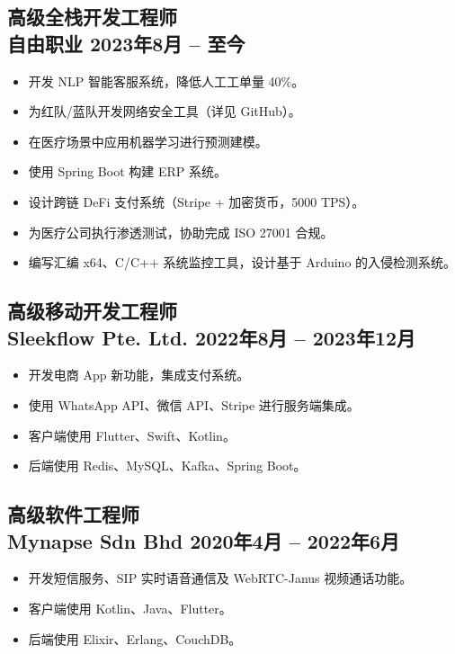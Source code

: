 \documentclass[11pt,a4paper]{article}
\begin{document}
\subsection*{高级全栈开发工程师 \\ 自由职业 \hfill 2023年8月 -- 至今}
\begin{itemize}[leftmargin=1.5em]
    \item 开发 NLP 智能客服系统，降低人工工单量 40\%。
    \item 为红队/蓝队开发网络安全工具（详见 GitHub）。
    \item 在医疗场景中应用机器学习进行预测建模。
    \item 使用 Spring Boot 构建 ERP 系统。
    \item 设计跨链 DeFi 支付系统（Stripe + 加密货币，5000 TPS）。
    \item 为医疗公司执行渗透测试，协助完成 ISO 27001 合规。
    \item 编写汇编 x64、C/C++ 系统监控工具，设计基于 Arduino 的入侵检测系统。
\end{itemize}

\subsection*{高级移动开发工程师 \\ Sleekflow Pte. Ltd. \hfill 2022年8月 -- 2023年12月}
\begin{itemize}[leftmargin=1.5em]
    \item 开发电商 App 新功能，集成支付系统。
    \item 使用 WhatsApp API、微信 API、Stripe 进行服务端集成。
    \item 客户端使用 Flutter、Swift、Kotlin。
    \item 后端使用 Redis、MySQL、Kafka、Spring Boot。
\end{itemize}

\subsection*{高级软件工程师 \\ Mynapse Sdn Bhd \hfill 2020年4月 -- 2022年6月}
\begin{itemize}[leftmargin=1.5em]
    \item 开发短信服务、SIP 实时语音通信及 WebRTC-Janus 视频通话功能。
    \item 客户端使用 Kotlin、Java、Flutter。
    \item 后端使用 Elixir、Erlang、CouchDB。
\end{itemize}
\end{document}
